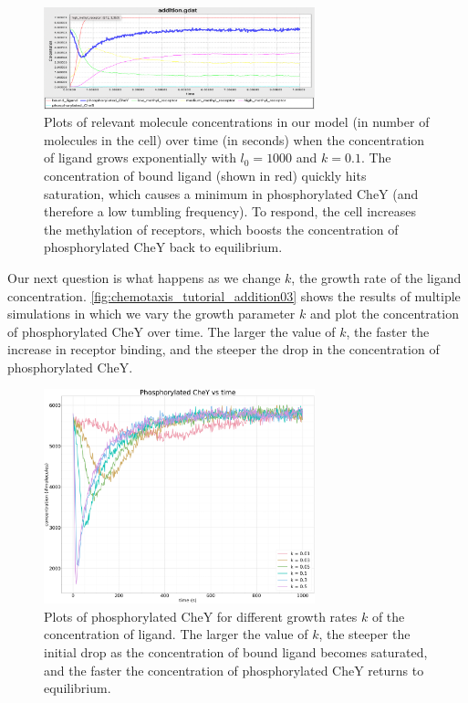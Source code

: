 \begin{figure}[h]
\centering
\mySfFamily
\includegraphics[width = 0.7\textwidth]{../images/chemotaxis_tutorial_addition01.png}
\caption{Plots of relevant molecule concentrations in our model (in number of molecules in the cell) over time (in seconds) when the concentration of ligand grows exponentially with $l_0 = 1000$ and $k = 0.1$. The concentration of bound ligand (shown in red) quickly hits saturation, which causes a minimum in phosphorylated CheY (and therefore a low tumbling frequency). To respond, the cell increases the methylation of receptors, which boosts the concentration of phosphorylated CheY back to equilibrium.}
\label{fig:chemotaxis_tutorial_addition01}
\end{figure}


Our next question is what happens as we change $k$, the growth rate of the ligand concentration. \autoref{fig:chemotaxis_tutorial_addition03} shows the results of multiple simulations in which we vary the growth parameter $k$ and plot the concentration of phosphorylated CheY over time. The larger the value of $k$, the faster the increase in receptor binding, and the steeper the drop in the concentration of phosphorylated CheY.

\begin{figure}[h]
\centering
\mySfFamily
\includegraphics[width = 0.7\textwidth]{../images/chemotaxis_tutorial_addition03.png}
\caption{Plots of phosphorylated CheY for different growth rates $k$ of the concentration of ligand. The larger the value of $k$, the steeper the initial drop as the concentration of bound ligand becomes saturated, and the faster the concentration of phosphorylated CheY returns to equilibrium.}
\label{fig:chemotaxis_tutorial_addition03}
\end{figure}

